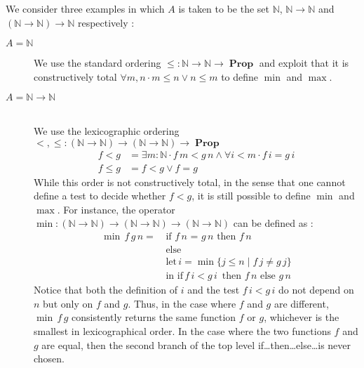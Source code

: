 \documentclass[envcountsame]{llncs}
\newcommand{\N}{\mathbb{N}}
\DeclareMathOperator{\Prop}{\mathbf{Prop}}
\begin{document}
We consider three examples in which  $A$ is taken to be the set $\N$, $\N\to\N$ and $(\N\to\N)\to\N$ respectively :
\begin{description}
\item[$A = \N$] \hfill

We use the standard ordering $\leq : \N \to \N \to \Prop$ and exploit
that it is constructively total $\forall m ,n\cdot m \leq n \lor n \leq m$ to define $\min$ and
$\max$.

\bigskip
\item[$A=\N\to\N$] \hfill\\
We use the lexicographic ordering ${<},{\leq}:(\N \to \N) \to (\N\to\N)\to\Prop$
\begin{align*}
f < g & = \exists m:\N \cdot f\,m < g\,n \wedge \forall i<m\cdot f\,i = g \,i\\
f \leq g &= f < g \vee f=g
\end{align*}
While this order is not constructively total, in the sense that one cannot define a test to decide whether $f<g$, it is still possible to define $\min$ and $\max$.
For instance, the operator $\min : (\N \to \N) \to (\N\to\N) \to (\N \to \N)$ can be defined as :
\begin{align*}
 \min\,f\,g\,n =\,&\text{if $f \,n$ = $g\,n$ then $f\,n$}\\
                 &\text{else }\\
                 &\text{let}\,i = \min \{ j \leq n \mid f\,j \not= g\,j \}\\
                 &\text{in }\text{if}\, f\,i< g\,i\,\text{ then } f\,n \text{ else } g\,n
\end{align*}
Notice that both the definition of $i$ and the test $f\,i< g\,i$ do not depend on $n$ but only on $f$ and $g$.  Thus, in the case where $f$ and $g$ are different, $\min\,f\,g$ consistently returns the same function $f$ or $g$, whichever is the smallest in lexicographical order. In the case where the two functions $f$ and $g$ are equal, then the second branch of the top level if\dots then\dots else\dots is never chosen.


\end{description}
\end{document}
